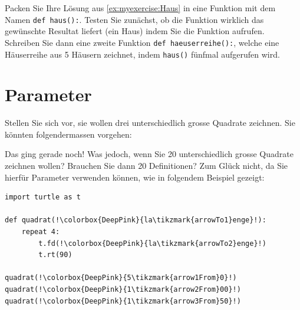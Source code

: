 \begin{myexercise}
Packen Sie Ihre Lösung aus \cref{ex:myexercise:Haus} in eine Funktion mit dem Namen \lstinline|def haus():|. Testen Sie zunächst, ob die  Funktion wirklich das gewünschte Resultat liefert (ein Haus) indem Sie die Funktion aufrufen. Schreiben Sie dann eine zweite Funktion \lstinline|def haeuserreihe():|, welche eine Häuserreihe aus 5 Häusern zeichnet, indem \lstinline|haus()| fünfmal aufgerufen wird.


\end{myexercise}


\section{Parameter}

\begin{myexample}\label{example:params}
Stellen Sie sich vor, sie wollen drei unterschiedlich grosse Quadrate zeichnen. Sie könnten folgendermassen vorgehen:



Das ging gerade noch! Was jedoch, wenn Sie 20 unterschiedlich grosse Quadrate zeichnen wollen? Brauchen Sie dann 20 Definitionen? Zum Glück nicht, da Sie hierfür Parameter verwenden können, wie in folgendem Beispiel gezeigt:



\begin{lstlisting}[escapechar=!]
import turtle as t

def quadrat(!\colorbox{DeepPink}{la\tikzmark{arrowTo1}enge}!):
	repeat 4:
		t.fd(!\colorbox{DeepPink}{la\tikzmark{arrowTo2}enge}!) 
		t.rt(90)

quadrat(!\colorbox{DeepPink}{5\tikzmark{arrow1From}0}!)
quadrat(!\colorbox{DeepPink}{1\tikzmark{arrow2From}00}!)
quadrat(!\colorbox{DeepPink}{1\tikzmark{arrow3From}50}!)
\end{lstlisting}
\end{myexample}

